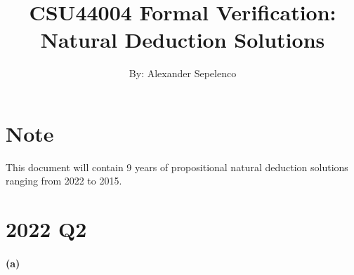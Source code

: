 \documentclass{article} %
\title{CSU44004 Formal Verification: Natural Deduction Solutions}
\author{By: Alexander Sepelenco}
\date{} %
\begin{document}
\maketitle

\section*{Note}

This document will contain 9 years of propositional natural deduction solutions ranging from 2022 to 2015.

\section*{2022 Q2}

\paragraph{(a)}
\end{document}
